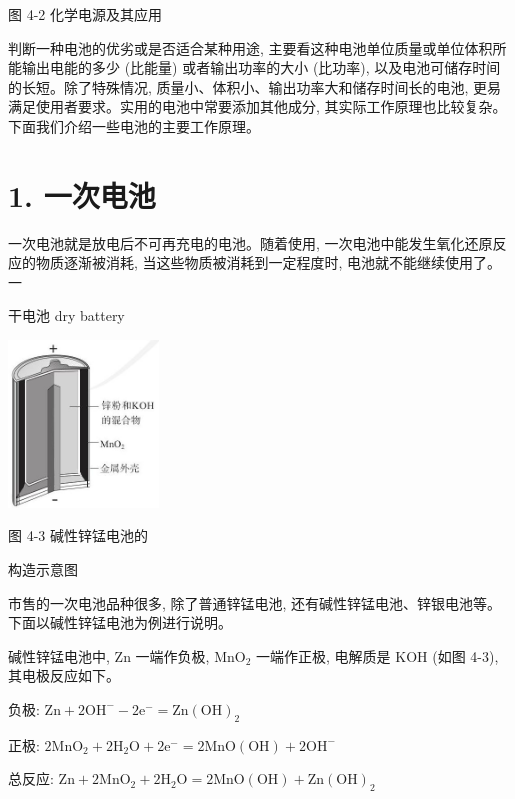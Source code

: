 \documentclass[10pt]{article}
\begin{document}
图 4-2 化学电源及其应用

判断一种电池的优劣或是否适合某种用途, 主要看这种电池单位质量或单位体积所能输出电能的多少 (比能量) 或者输出功率的大小 (比功率), 以及电池可储存时间的长短。除了特殊情况, 质量小、体积小、输出功率大和储存时间长的电池, 更易满足使用者要求。实用的电池中常要添加其他成分, 其实际工作原理也比较复杂。下面我们介绍一些电池的主要工作原理。

\section*{1. 一次电池}

一次电池就是放电后不可再充电的电池。随着使用, 一次电池中能发生氧化还原反应的物质逐渐被消耗, 当这些物质被消耗到一定程度时, 电池就不能继续使用了。一

干电池 dry battery

\begin{center}
\includegraphics[max width=0.3\textwidth]{images/0190da9d-8bfd-732f-bc2c-0b21d0f13b91_103_813239.jpg}
\end{center}

图 4-3 碱性锌锰电池的

构造示意图

市售的一次电池品种很多, 除了普通锌锰电池, 还有碱性锌锰电池、锌银电池等。下面以碱性锌锰电池为例进行说明。

碱性锌锰电池中, \(\mathrm{{Zn}}\) 一端作负极, \({\mathrm{{MnO}}}_{2}\) 一端作正极, 电解质是 \(\mathrm{{KOH}}\) (如图 4-3),其电极反应如下。

负极: \(\mathrm{{Zn}} + 2{\mathrm{{OH}}}^{ - } - 2{\mathrm{e}}^{ - } = \mathrm{{Zn}}{\left( \mathrm{{OH}}\right) }_{2}\)

正极: \(2{\mathrm{{MnO}}}_{2} + 2{\mathrm{H}}_{2}\mathrm{O} + 2{\mathrm{e}}^{ - } = 2\mathrm{{MnO}}\left( \mathrm{{OH}}\right) + 2{\mathrm{{OH}}}^{ - }\)

总反应: \(\mathrm{{Zn}} + 2{\mathrm{{MnO}}}_{2} + 2{\mathrm{H}}_{2}\mathrm{O} = 2\mathrm{{MnO}}\left( \mathrm{{OH}}\right) + \mathrm{{Zn}}{\left( \mathrm{{OH}}\right) }_{2}\)
\end{document}
